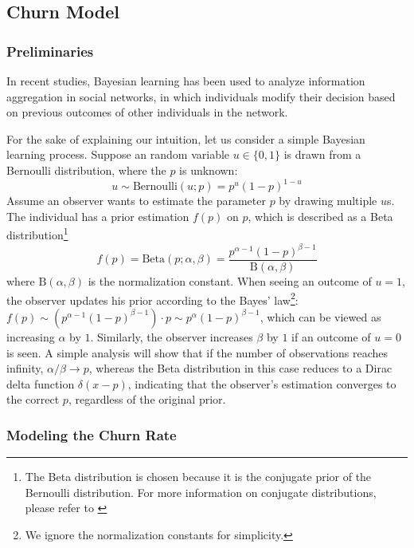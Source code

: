 \documentclass[tcn = 37075, sheet = false, abstract = false]{mcmthesis}
\begin{document}
\subsection{Churn Model}

\subsubsection{Preliminaries}

In recent studies, Bayesian learning has been used to analyze information aggregation in social networks\cite{acemoglu2011bayesian}\cite{gale2003bayesian}, in which individuals modify their decision based on previous outcomes of other individuals in the network. 

For the sake of explaining our intuition, let us consider a simple Bayesian learning process. Suppose an random variable $u \in \{0, 1\}$ is drawn from a Bernoulli distribution, where the $p$ is unknown:
\begin{equation}
u \sim \mathrm{Bernoulli}(u; p) = p^u(1-p)^{1-u}
\end{equation}
Assume an observer wants to estimate the parameter $p$ by drawing multiple $u$s. The individual has a prior estimation $f(p)$ on $p$, which is described as a Beta distribution\footnote{The Beta distribution is chosen because it is the conjugate prior of the Bernoulli distribution. For more information on conjugate distributions, please refer to  \cite{bishop2006pattern}}
\begin{equation}
 f(p) = \mathrm{Beta}(p; \alpha, \beta) = \frac{p^{\alpha - 1}(1-p)^{\beta - 1}}{\mathrm{B}(\alpha, \beta)}
\end{equation}
where $\mathrm{B}(\alpha, \beta)$ is the normalization constant.
When seeing an outcome of $u = 1$, the observer updates his prior according to the Bayes' law\footnote{We ignore the normalization constants for simplicity.}: $f(p) \sim (p^{\alpha-1}(1-p)^{\beta-1}) \cdot p \sim p^{\alpha}(1-p)^{\beta-1}$, which can be viewed as increasing $\alpha$ by $1$. Similarly, the observer increases $\beta$ by $1$ if an outcome of $u = 0$ is seen. A simple analysis will show that if the number of observations reaches infinity, $\alpha / \beta \rightarrow p$, whereas the Beta distribution in this case reduces to a Dirac delta function $\delta(x - p)$, indicating that the observer's estimation converges to the correct $p$, regardless of the original prior.

\subsubsection{Modeling the Churn Rate}
\end{document}
